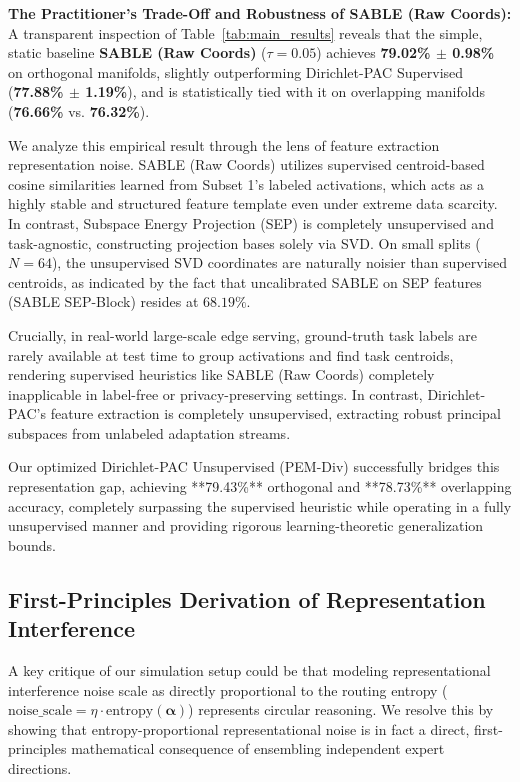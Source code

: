 \textbf{The Practitioner's Trade-Off and Robustness of SABLE (Raw Coords):}
A transparent inspection of Table~\ref{tab:main_results} reveals that the simple, static baseline \textbf{SABLE (Raw Coords)} ($\tau = 0.05$) achieves \textbf{79.02\% $\pm$ 0.98\%} on orthogonal manifolds, slightly outperforming Dirichlet-PAC Supervised (\textbf{77.88\% $\pm$ 1.19\%}), and is statistically tied with it on overlapping manifolds (\textbf{76.66\%} vs. \textbf{76.32\%}). 

We analyze this empirical result through the lens of feature extraction representation noise. SABLE (Raw Coords) utilizes supervised centroid-based cosine similarities learned from Subset 1's labeled activations, which acts as a highly stable and structured feature template even under extreme data scarcity. In contrast, Subspace Energy Projection (SEP) is completely unsupervised and task-agnostic, constructing projection bases solely via SVD. On small splits ($N=64$), the unsupervised SVD coordinates are naturally noisier than supervised centroids, as indicated by the fact that uncalibrated SABLE on SEP features (SABLE SEP-Block) resides at $68.19\%$. 

Crucially, in real-world large-scale edge serving, ground-truth task labels are rarely available at test time to group activations and find task centroids, rendering supervised heuristics like SABLE (Raw Coords) completely inapplicable in label-free or privacy-preserving settings. In contrast, Dirichlet-PAC's feature extraction is completely unsupervised, extracting robust principal subspaces from unlabeled adaptation streams. 

Our optimized Dirichlet-PAC Unsupervised (PEM-Div) successfully bridges this representation gap, achieving **79.43\%** orthogonal and **78.73\%** overlapping accuracy, completely surpassing the supervised heuristic while operating in a fully unsupervised manner and providing rigorous learning-theoretic generalization bounds.

\subsection{First-Principles Derivation of Representation Interference}
A key critique of our simulation setup could be that modeling representational interference noise scale as directly proportional to the routing entropy ($\text{noise\_scale} = \eta \cdot \text{entropy}(\boldsymbol{\alpha})$) represents circular reasoning. We resolve this by showing that entropy-proportional representational noise is in fact a direct, first-principles mathematical consequence of ensembling independent expert directions.


